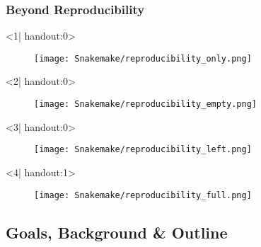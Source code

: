 \begin{frame}
  \frametitle{Beyond Reproducibility}
  \begin{onlyenv}<1| handout:0>
    \begin{figure}
      \centering
      \texttt{[image: Snakemake/reproducibility\_only.png]}
    \end{figure}
  \end{onlyenv}
  \begin{onlyenv}<2| handout:0>
    \begin{figure}
      \centering
      \texttt{[image: Snakemake/reproducibility\_empty.png]}
    \end{figure}
  \end{onlyenv}
  \begin{onlyenv}<3| handout:0>
    \begin{figure}
      \centering
      \texttt{[image: Snakemake/reproducibility\_left.png]}
    \end{figure}
  \end{onlyenv}
    \begin{onlyenv}<4| handout:1>
      \begin{figure}
        \centering
        \texttt{[image: Snakemake/reproducibility\_full.png]}
      \end{figure}
  \end{onlyenv}
  \footnotesize{}
\end{frame}


\subsection{Goals, Background \& Outline}


